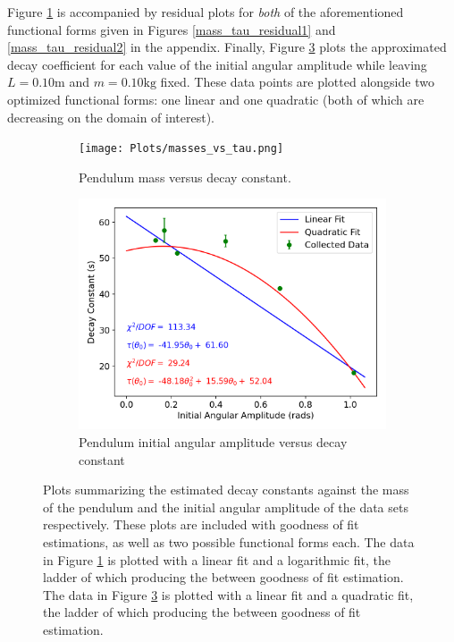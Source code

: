 Figure \ref{mass_tau} is accompanied by residual plots for \emph{both} of the aforementioned functional forms given in Figures \ref{mass_tau_residual1} and \ref{mass_tau_residual2} in the appendix. Finally, Figure \ref{amplitude_tau} plots the approximated decay coefficient for each value of the initial angular amplitude while leaving $L = 0.10\text{m}$ and $m = 0.10\text{kg}$ fixed. These data points are plotted alongside two optimized functional forms: one linear and one quadratic (both of which are decreasing on the domain of interest). 


\begin{figure}[H]
\centering
\begin{subfigure}[t]{0.5\textwidth}
  \centering
  \texttt{[image: Plots/masses\_vs\_tau.png]}
  \caption{\small{Pendulum mass versus decay constant.}}
  \label{mass_tau}
\end{subfigure}%
\begin{subfigure}[t]{.5\textwidth}
  \centering
  \includegraphics[width=\textwidth]{Plots/theta_vs_tau.png}
  \caption{\small{Pendulum initial angular amplitude versus decay constant}}
  \label{amplitude_tau}
\end{subfigure}
\caption{\small{Plots summarizing the estimated decay constants against the mass of the pendulum and the initial angular amplitude of the data sets respectively. These plots are included with goodness of fit estimations, as well as two possible functional forms each. The data in Figure \ref{mass_tau} is plotted with a linear fit and a logarithmic fit, the ladder of which producing the between goodness of fit estimation. The data in Figure \ref{amplitude_tau} is plotted with a linear fit and a quadratic fit, the ladder of which producing the between goodness of fit estimation.}}
\end{figure}

